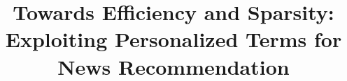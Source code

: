 \documentclass[sigconf,anonymous]{acmart}
\begin{document}
\title{Towards Efficiency and Sparsity: Exploiting Personalized Terms for News Recommendation}






\end{document}
